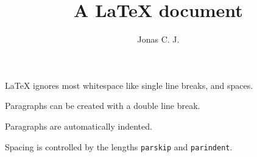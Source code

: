 \documentclass[a4paper, 12pt]{article}
\title{A \LaTeX{} document}
\author{Jonas C. J.}
\begin{document}
\maketitle
\noindent \LaTeX{} ignores most whitespace like single
line breaks,
and      spaces.

Paragraphs can be created with a double line break.

Paragraphs are automatically indented.

Spacing is controlled by the lengths \verb!parskip! and \verb!parindent!.
\end{document}
